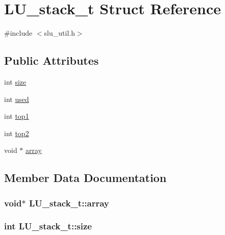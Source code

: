 \hypertarget{structLU__stack__t}{}\section{L\+U\+\_\+stack\+\_\+t Struct Reference}
\label{structLU__stack__t}


{\ttfamily \#include $<$slu\+\_\+util.\+h$>$}

\subsection*{Public Attributes}
\begin{DoxyCompactItemize}
\item 
int \hyperlink{structLU__stack__t_af05e6775b79809e7bcc0c92da24c12f5}{size}
\item 
int \hyperlink{structLU__stack__t_a78ad1773677b220bd843c9d84bbda869}{used}
\item 
int \hyperlink{structLU__stack__t_a3ba965e6621326c518c95d791afe6fef}{top1}
\item 
int \hyperlink{structLU__stack__t_a1ae2a485bc81409ceb05bce271363901}{top2}
\item 
void $\ast$ \hyperlink{structLU__stack__t_ac76a2713e4f4c516d7189303b6f82c8d}{array}
\end{DoxyCompactItemize}


\subsection{Member Data Documentation}
\hypertarget{structLU__stack__t_ac76a2713e4f4c516d7189303b6f82c8d}{}
\subsubsection[{array}]{\setlength{\rightskip}{0pt plus 5cm}void$\ast$ L\+U\+\_\+stack\+\_\+t\+::array}\label{structLU__stack__t_ac76a2713e4f4c516d7189303b6f82c8d}
\hypertarget{structLU__stack__t_af05e6775b79809e7bcc0c92da24c12f5}{}
\subsubsection[{size}]{\setlength{\rightskip}{0pt plus 5cm}int L\+U\+\_\+stack\+\_\+t\+::size}\label{structLU__stack__t_af05e6775b79809e7bcc0c92da24c12f5}
\hypertarget{structLU__stack__t_a3ba965e6621326c518c95d791afe6fef}{}
